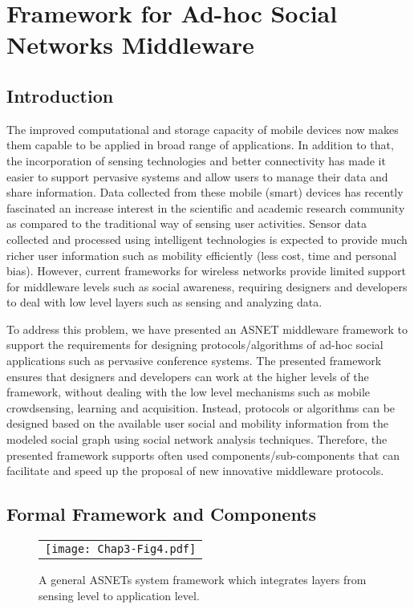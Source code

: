 \chapter{Framework for Ad-hoc Social Networks Middleware}\label{Chap3}

\section{Introduction}\label{Chap3_01}
The improved computational and storage capacity of mobile devices now makes them capable to be applied in broad range of applications. In addition to that, the incorporation of sensing technologies and better connectivity has made it easier to support pervasive systems and allow users to manage their data and share information. Data collected from these mobile (smart) devices has recently fascinated an increase interest in the scientific and academic research community as compared to the traditional way of sensing user activities. Sensor data collected and processed using intelligent technologies is expected to provide much richer user information such as mobility efficiently (less cost, time and personal bias). However, current frameworks for wireless networks provide limited support for middleware levels such as social awareness, requiring designers and developers to deal with low level layers such as sensing and analyzing data.

To address this problem, we have presented an ASNET middleware framework to support the requirements for designing protocols/algorithms of ad-hoc social applications such as pervasive conference systems. The presented framework ensures that designers and developers can work at the higher levels of the framework, without dealing with the low level mechanisms such as mobile crowdsensing, learning and acquisition. Instead, protocols or algorithms can be designed based on the available user social and mobility information from the modeled social graph using social network analysis techniques. Therefore, the presented framework supports often used components/sub-components that can facilitate and speed up the proposal of new innovative middleware protocols.

\section{Formal Framework and Components}\label{Chap3_02}
\begin{figure}[t]
\begin{center}
  \begin{tabular}{c}
  \texttt{[image: Chap3-Fig4.pdf]}
  \end{tabular}
  \caption{A general ASNETs system framework which integrates layers from sensing level to application level.}
\end{center}
\end{figure}

